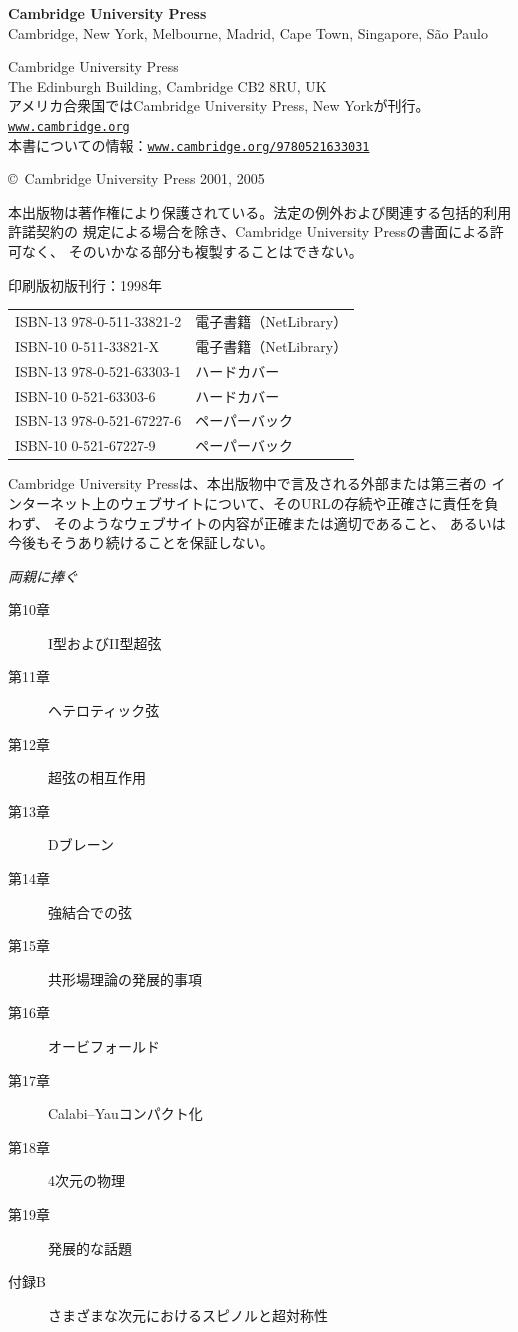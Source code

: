 \clearpage
{}
\begingroup
\small
\noindent\textbf{Cambridge University Press}\\
Cambridge, New York, Melbourne, Madrid, Cape Town, Singapore, São Paulo

\noindent Cambridge University Press\\
The Edinburgh Building, Cambridge CB2 8RU, UK\\
アメリカ合衆国ではCambridge University Press, New Yorkが刊行。\\
\href{https://www.cambridge.org}{\nolinkurl{www.cambridge.org}}\\
本書についての情報：\href{https://www.cambridge.org/9780521633031}{\nolinkurl{www.cambridge.org/9780521633031}}

\noindent\copyright\ Cambridge University Press 2001, 2005

本出版物は著作権により保護されている。法定の例外および関連する包括的利用許諾契約の
規定による場合を除き、Cambridge University Pressの書面による許可なく、
そのいかなる部分も複製することはできない。

\noindent 印刷版初版刊行：1998年

\begin{tabular}{@{}ll@{}}
ISBN-13 978-0-511-33821-2 & 電子書籍（NetLibrary）\\
ISBN-10 0-511-33821-X & 電子書籍（NetLibrary）\\[1ex]
ISBN-13 978-0-521-63303-1 & ハードカバー\\
ISBN-10 0-521-63303-6 & ハードカバー\\[1ex]
ISBN-13 978-0-521-67227-6 & ペーパーバック\\
ISBN-10 0-521-67227-9 & ペーパーバック
\end{tabular}

Cambridge University Pressは、本出版物中で言及される外部または第三者の
インターネット上のウェブサイトについて、そのURLの存続や正確さに責任を負わず、
そのようなウェブサイトの内容が正確または適切であること、
あるいは今後もそうあり続けることを保証しない。
\endgroup

\bigskip
\begin{center}
\itshape 両親に捧ぐ
\end{center}

\clearpage
{}
\begin{description}
\item[第10章] I型およびII型超弦
\item[第11章] ヘテロティック弦
\item[第12章] 超弦の相互作用
\item[第13章] Dブレーン
\item[第14章] 強結合での弦
\item[第15章] 共形場理論の発展的事項
\item[第16章] オービフォールド
\item[第17章] Calabi--Yauコンパクト化
\item[第18章] 4次元の物理
\item[第19章] 発展的な話題
\item[付録B] さまざまな次元におけるスピノルと超対称性
\end{description}


